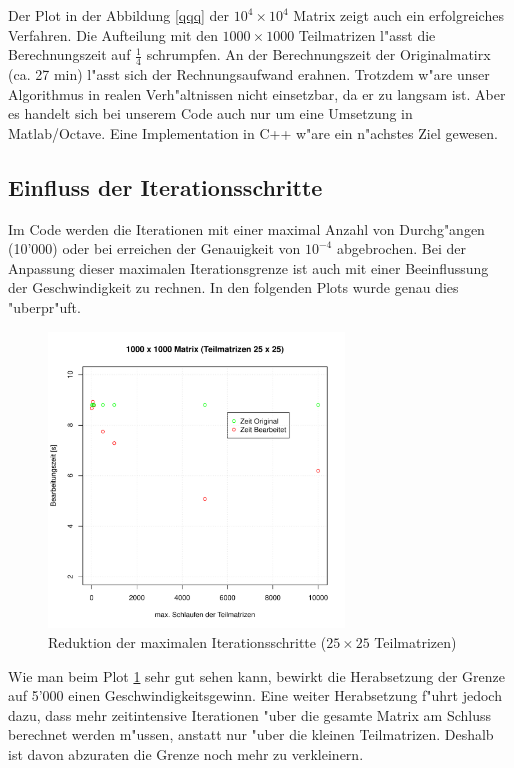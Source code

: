 \begin{refsection}
Der Plot in der Abbildung \ref{qqq} der $10^4\times10^4$ Matrix zeigt
auch ein erfolgreiches Verfahren. Die Aufteilung mit den
$1000\times1000$ Teilmatrizen l"asst die Berechnungszeit auf
$\frac{1}{4}$ schrumpfen.  An der Berechnungszeit der Originalmatirx
(ca. 27 min) l"asst sich der Rechnungsaufwand erahnen. Trotzdem w"are
unser Algorithmus in realen Verh"altnissen nicht einsetzbar, da er zu
langsam ist. Aber es handelt sich bei unserem Code auch nur um eine
Umsetzung in Matlab/Octave. Eine Implementation in C++ w"are ein
n"achstes Ziel gewesen.

\subsection[Iterationsschritte]{Einfluss der Iterationsschritte}
Im Code werden die Iterationen mit einer maximal Anzahl von
Durchg"angen (10'000) oder bei erreichen der Genauigkeit von $10^{-4}$
abgebrochen. Bei der Anpassung dieser maximalen Iterationsgrenze ist
auch mit einer Beeinflussung der Geschwindigkeit zu rechnen. In den
folgenden Plots wurde genau dies "uberpr"uft.

\begin{figure}
\begin{center}
\includegraphics[width=0.7\textwidth]{./mapreduce/PC1000spec25.pdf}
\end{center}
\caption{Reduktion der maximalen Iterationsschritte ($25\times25$ Teilmatrizen)}
\label{w}
\end{figure}

Wie man beim Plot \ref{w} sehr gut sehen kann, bewirkt die
Herabsetzung der Grenze auf 5'000 einen Geschwindigkeitsgewinn. Eine
weiter Herabsetzung f"uhrt jedoch dazu, dass mehr zeitintensive
Iterationen "uber die gesamte Matrix am Schluss berechnet werden
m"ussen, anstatt nur "uber die kleinen Teilmatrizen. Deshalb ist davon
abzuraten die Grenze noch mehr zu verkleinern.


\end{refsection}
